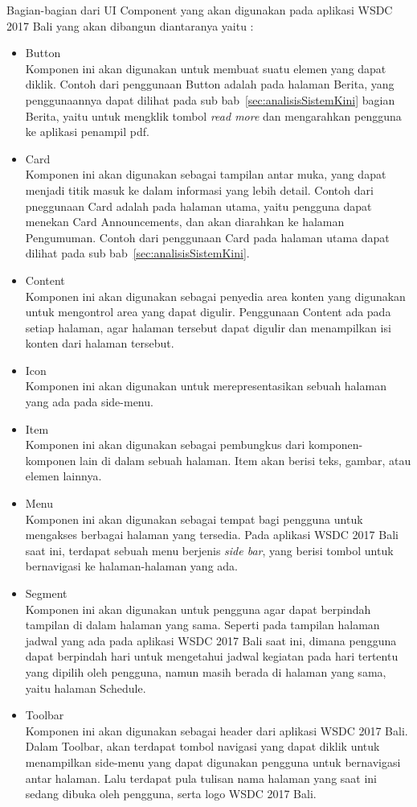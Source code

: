 Bagian-bagian dari UI Component yang akan digunakan pada aplikasi WSDC 2017 Bali yang akan dibangun diantaranya yaitu :
\newpage
\begin{itemize}
	\item Button \\
	Komponen ini akan digunakan untuk membuat suatu elemen yang dapat diklik. Contoh dari penggunaan Button adalah pada halaman Berita, yang penggunaannya dapat dilihat pada sub bab~\ref{sec:analisisSistemKini} bagian Berita, yaitu untuk mengklik tombol {\it read more} dan mengarahkan pengguna ke aplikasi penampil pdf.
	\item Card \\
	Komponen ini akan digunakan sebagai tampilan antar muka, yang dapat menjadi titik masuk ke dalam informasi yang lebih detail. Contoh dari pneggunaan Card adalah pada halaman utama, yaitu pengguna dapat menekan Card Announcements, dan akan diarahkan ke halaman Pengumuman. Contoh dari penggunaan Card pada halaman utama dapat dilihat pada sub bab~\ref{sec:analisisSistemKini}.
	\item Content \\
	Komponen ini akan digunakan sebagai penyedia area konten yang digunakan untuk mengontrol area yang dapat digulir. Penggunaan Content ada pada setiap halaman, agar halaman tersebut dapat digulir dan menampilkan isi konten dari halaman tersebut.
	\item Icon \\
	Komponen ini akan digunakan untuk merepresentasikan sebuah halaman yang ada pada side-menu.
	\item Item \\
	Komponen ini akan digunakan sebagai pembungkus dari komponen-komponen lain di dalam sebuah halaman. Item akan berisi teks, gambar, atau elemen lainnya.
	\item Menu \\
	Komponen ini akan digunakan sebagai tempat bagi pengguna untuk mengakses berbagai halaman yang tersedia. Pada aplikasi WSDC 2017 Bali saat ini, terdapat sebuah menu berjenis \textit{side bar}, yang berisi tombol untuk bernavigasi ke halaman-halaman yang ada. 
	\item Segment \\
	Komponen ini akan digunakan untuk pengguna agar dapat berpindah tampilan di dalam halaman yang sama. Seperti pada tampilan halaman jadwal yang ada pada aplikasi WSDC 2017 Bali saat ini, dimana pengguna dapat berpindah hari untuk mengetahui jadwal kegiatan pada hari tertentu yang dipilih oleh pengguna, namun masih berada di halaman yang sama, yaitu halaman Schedule.
	\item Toolbar \\
	Komponen ini akan digunakan sebagai header dari aplikasi WSDC 2017 Bali. Dalam Toolbar, akan terdapat tombol navigasi yang dapat diklik untuk menampilkan side-menu yang dapat digunakan pengguna untuk bernavigasi antar halaman. Lalu terdapat pula tulisan nama halaman yang saat ini sedang dibuka oleh pengguna, serta logo WSDC 2017 Bali.
\end{itemize}

